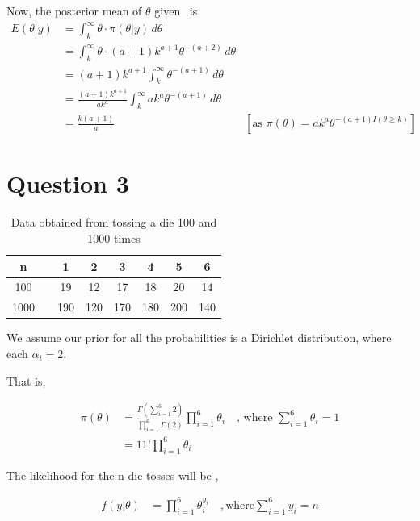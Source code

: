 \documentclass[a4paper]{article}
\begin{document}
Now, the posterior mean of \(\theta\) given \ is 
\begin{align*}
    E(\theta|y) &= \int_{k}^{\infty} \theta \cdot \pi(\theta|y) \,d\theta \\
    &= \int_{k}^{\infty} \theta \cdot (a+1) k^{a+1} \theta^{-(a+2)}\,d\theta \\
    &= (a+1)k^{a+1} \int_{k}^{\infty} \theta^{-(a+1)}\, d\theta\\
    &= \frac{(a+1)k^{a+1}}{ak^{a}} \int_{k}^{\infty} a k^{a} \theta^{-(a+1)}\, d\theta \\
    &= \frac{k(a+1)}{a} & [\text{as \(\pi(\theta) = a k^{a} \theta^{-(a+1) I(\theta \geq k)}\)}]
\end{align*}


\newpage

\section*{Question 3}

\begin{table}[ht]
    \centering
    \begin{tabular}{@{}cccccccc@{}}
        \toprule
        n & &1 & 2 & 3 & 4 & 5 & 6\\
        \midrule
        100 & &19 & 12 & 17 & 18 & 20 & 14\\
        1000 & &190 & 120 & 170 & 180 & 200 & 140\\
        \bottomrule
    \end{tabular}
    \caption{Data obtained from tossing a die 100 and 1000 times}
\end{table}

We assume our prior for all the probabilities is a Dirichlet distribution, where each \(\alpha_i = 2\). 

That is,

\begin{align*}
    \pi(\theta) &= \frac{\Gamma(\sum_{i=1}^{6} 2)}{\prod_{i=1}^{6} \Gamma(2)} \prod_{i=1}^{6} \theta_i \quad \text{, where \(\sum_{i=1}^{6} \theta_i = 1\)} \\
    &= 11! \prod_{i=1}^{6} \theta_i
\end{align*}

The likelihood for the n die tosses will be ,

\begin{align*}
    f(y|\theta) &= \prod_{i=1}^{6} \theta_i^{y_i} \quad ,\text{where} \sum_{i=1}^{6} y_i = n
\end{align*}
\end{document}

